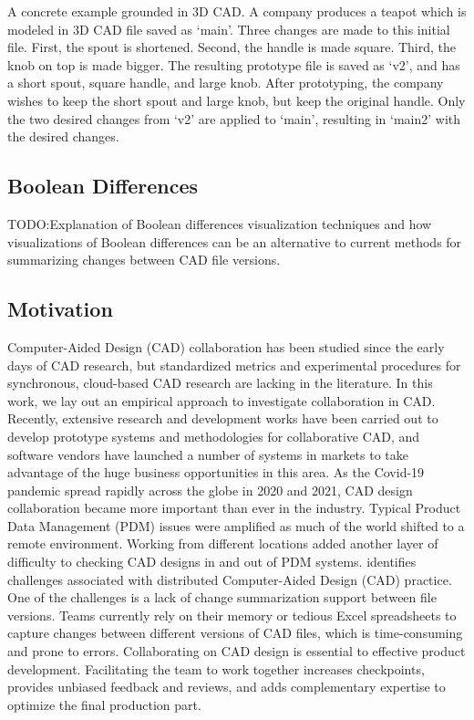 \documentclass[sigconf,authorversion,nonacm]{acmart}
\begin{document}
A concrete example grounded in 3D CAD.
A company produces a teapot which is modeled in 3D CAD file saved as `main'.
Three changes are made to this initial file.
First, the spout is shortened.
Second, the handle is made square.
Third, the knob on top is made bigger.
The resulting prototype file is saved as `v2', and has a short spout, square handle, and large knob.
After prototyping, the company wishes to keep the short spout and large knob, but keep the original handle.
Only the two desired changes from `v2' are applied to `main', resulting in `main2' with the desired changes.

\subsection{Boolean Differences}

TODO:Explanation of Boolean differences visualization techniques and how visualizations of Boolean differences can be an alternative to current methods for summarizing changes between CAD file versions.
\subsection{Motivation}
Computer-Aided Design (CAD) collaboration has been studied since the early days of CAD research, but standardized metrics and experimental procedures for synchronous, cloud-based CAD research are lacking in the literature. In this work, we lay out an empirical approach to investigate collaboration in CAD.
Recently, extensive research and development works have been carried out to develop prototype systems and methodologies for collaborative CAD, and software vendors have launched a number of systems in markets to take advantage of the huge business opportunities in this area.
As the Covid-19 pandemic spread rapidly across the globe in 2020 and 2021, CAD design collaboration became more important than ever in the industry.
Typical Product Data Management (PDM) issues were amplified as much of the world shifted to a remote environment. Working from different locations added another layer of difficulty to checking CAD designs in and out of PDM systems.
\citet{cheng2023age} identifies challenges associated with distributed Computer-Aided Design (CAD) practice. One of the challenges is a lack of change summarization support between file versions.
Teams currently rely on their memory or tedious Excel spreadsheets to capture changes between different versions of CAD files, which is time-consuming and prone to errors.
Collaborating on CAD design is essential to effective product development. Facilitating the team to work together increases checkpoints, provides unbiased feedback and reviews, and adds complementary expertise to optimize the final production part.
\end{document}
